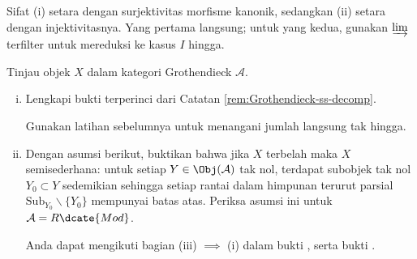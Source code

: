 \begin{Exercises}
	\begin{hint}
		Sifat (i) setara dengan surjektivitas morfisme kanonik, sedangkan (ii)
		setara dengan injektivitasnya. Yang pertama langsung; untuk yang kedua,
		gunakan $\varinjlim$ terfilter untuk mereduksi ke kasus $I$ hingga.
	\end{hint}

	\item Tinjau objek $X$ dalam kategori Grothendieck $\mathcal{A}$.
	\begin{enumerate}[(i)]
		\item Lengkapi bukti terperinci dari Catatan
		\ref{rem:Grothendieck-ss-decomp}.
		\begin{hint}
			Gunakan latihan sebelumnya untuk menangani jumlah langsung tak hingga.
		\end{hint}
		\item Dengan asumsi berikut, buktikan bahwa jika $X$ terbelah maka $X$
		semisederhana: untuk setiap $Y\in\Obj(\mathcal{A})$ tak nol, terdapat
		subobjek tak nol $Y_0\subset Y$ sedemikian sehingga setiap rantai dalam
		himpunan terurut parsial
		$\mathrm{Sub}_{Y_0}\smallsetminus\{Y_0\}$ mempunyai batas atas.
		Periksa asumsi ini untuk $\mathcal{A}=R\dcate{Mod}$.
		\begin{hint}
			Anda dapat mengikuti bagian (iii) $\implies$ (i) dalam bukti
			\cite[Proposisi 6.11.4]{Li1}, serta bukti
			\cite[Lema 6.11.3]{Li1}.
		\end{hint}
	\end{enumerate}
\end{Exercises}
